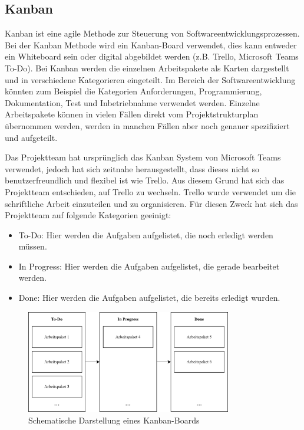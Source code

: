 \subsection{Kanban}

Kanban ist eine agile Methode zur Steuerung von Softwareentwicklungsprozessen. Bei der Kanban Methode wird ein Kanban-Board verwendet, dies kann entweder ein Whiteboard sein oder digital abgebildet werden (z.B. Trello, Microsoft Teams To-Do). Bei Kanban werden die einzelnen Arbeitspakete als Karten dargestellt und in verschiedene Kategorieren eingeteilt. Im Bereich der Softwareentwicklung könnten zum Beispiel die Kategorien Anforderungen, Programmierung, Dokumentation, Test und Inbetriebnahme verwendet werden. Einzelne Arbeitspakete können in vielen Fällen direkt vom Projektstrukturplan übernommen werden, werden in manchen Fällen aber noch genauer spezifiziert und aufgeteilt. 

Das Projektteam hat ursprünglich das Kanban System von Microsoft Teams verwendet, jedoch hat sich zeitnahe herausgestellt, dass dieses nicht so benutzerfreundlich und flexibel ist wie Trello. Aus diesem Grund hat sich das Projektteam entschieden, auf Trello zu wechseln. Trello wurde verwendet um die schriftliche Arbeit einzuteilen und zu organisieren. Für diesen Zweck hat sich das Projektteam auf folgende Kategorien geeinigt:
\begin{itemize}
    \item To-Do: Hier werden die Aufgaben aufgelistet, die noch erledigt werden müssen.
    \item In Progress: Hier werden die Aufgaben aufgelistet, die gerade bearbeitet werden.
    \item Done: Hier werden die Aufgaben aufgelistet, die bereits erledigt wurden.
\end{itemize}

\begin{figure}[H]
    \centering
    \includegraphics[width=0.8\textwidth]{images/kanban.png}
    \caption{Schematische Darstellung eines Kanban-Boards}
    \label{fig:kanban}
\end{figure}

